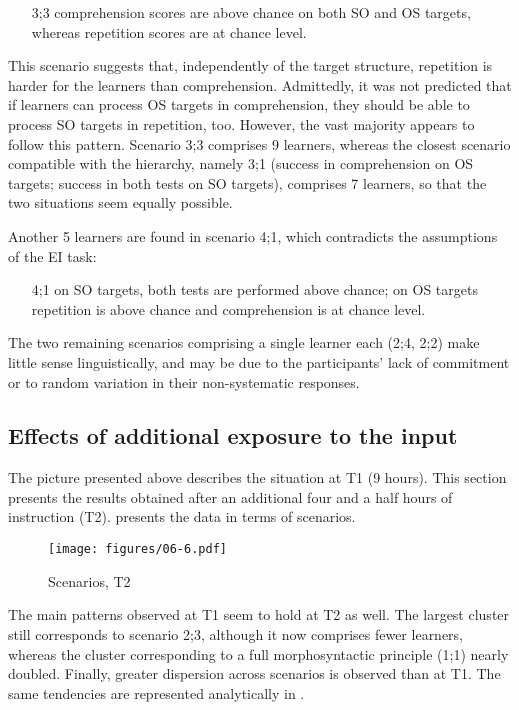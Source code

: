 \begin{itemize}
    \item[3;3]  comprehension scores are above chance on both SO and OS targets, where\-as repetition scores are at chance level.
\end{itemize}

This scenario suggests that, independently of the target structure, repetition is harder for the learners than comprehension. Admittedly, it was not predicted that if learners can process OS targets in comprehension, they should be able to process SO targets in repetition, too. However, the vast majority appears to follow this pattern. Scenario 3;3 comprises 9 learners, whereas the closest scenario compatible with the hierarchy, namely 3;1 (success in comprehension on OS targets; success in both tests on SO targets), comprises 7 learners, so that the two situations seem equally possible. 

Another 5 learners are found in scenario 4;1, which contradicts the assumptions of the EI task: 

\begin{itemize}
    \item[4;1]  on SO targets, both tests are performed above chance; on OS targets repetition is above chance and comprehension is at chance level. 
\end{itemize}

The two remaining scenarios comprising a single learner each (2;4, 2;2) make little sense linguistically, and may be due to the participants’ lack of commitment or to random variation in their non-systematic responses. 

\subsection{Effects of additional exposure to the input}\label{sec:06:3.1}

The picture presented above describes the situation at T1 (9 hours). This section presents the results obtained after an additional four and a half hours of instruction (T2).  presents the data in terms of scenarios.

\begin{figure}
    \texttt{[image: figures/06-6.pdf]}
    \caption{Scenarios, T2}
    \label{fig:06:6}
\end{figure}

The main patterns observed at T1 seem to hold at T2 as well. The largest cluster still corresponds to scenario 2;3, although it now comprises fewer learners, whereas the cluster corresponding to a full morphosyntactic principle (1;1) nearly doubled. Finally, greater dispersion across scenarios is observed than at T1. The same tendencies are represented analytically in .

